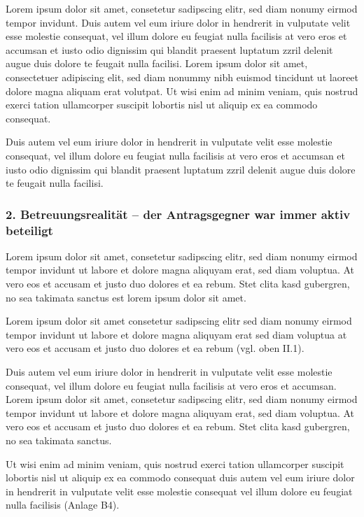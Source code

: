 \documentclass[
  11pt,
  a4paper,
]{article}
\begin{document}
Lorem ipsum dolor sit amet, consetetur sadipscing elitr, sed diam nonumy
eirmod tempor invidunt. Duis autem vel eum iriure dolor in hendrerit in
vulputate velit esse molestie consequat, vel illum dolore eu feugiat
nulla facilisis at vero eros et accumsan et iusto odio dignissim qui
blandit praesent luptatum zzril delenit augue duis dolore te feugait
nulla facilisi. Lorem ipsum dolor sit amet, consectetuer adipiscing
elit, sed diam nonummy nibh euismod tincidunt ut laoreet dolore magna
aliquam erat volutpat. Ut wisi enim ad minim veniam, quis nostrud exerci
tation ullamcorper suscipit lobortis nisl ut aliquip ex ea commodo
consequat.

Duis autem vel eum iriure dolor in hendrerit in vulputate velit esse
molestie consequat, vel illum dolore eu feugiat nulla facilisis at vero
eros et accumsan et iusto odio dignissim qui blandit praesent luptatum
zzril delenit augue duis dolore te feugait nulla facilisi.

\subsubsection{2. Betreuungsrealität -- der Antragsgegner war immer
aktiv
beteiligt}\label{betreuungsrealituxe4t-der-antragsgegner-war-immer-aktiv-beteiligt}

Lorem ipsum dolor sit amet, consetetur sadipscing elitr, sed diam nonumy
eirmod tempor invidunt ut labore et dolore magna aliquyam erat, sed diam
voluptua. At vero eos et accusam et justo duo dolores et ea rebum. Stet
clita kasd gubergren, no sea takimata sanctus est lorem ipsum dolor sit
amet.

Lorem ipsum dolor sit amet consetetur sadipscing elitr sed diam nonumy
eirmod tempor invidunt ut labore et dolore magna aliquyam erat sed diam
voluptua at vero eos et accusam et justo duo dolores et ea rebum (vgl.
oben II.1).

Duis autem vel eum iriure dolor in hendrerit in vulputate velit esse
molestie consequat, vel illum dolore eu feugiat nulla facilisis at vero
eros et accumsan. Lorem ipsum dolor sit amet, consetetur sadipscing
elitr, sed diam nonumy eirmod tempor invidunt ut labore et dolore magna
aliquyam erat, sed diam voluptua. At vero eos et accusam et justo duo
dolores et ea rebum. Stet clita kasd gubergren, no sea takimata sanctus.

Ut wisi enim ad minim veniam, quis nostrud exerci tation ullamcorper
suscipit lobortis nisl ut aliquip ex ea commodo consequat duis autem vel
eum iriure dolor in hendrerit in vulputate velit esse molestie consequat
vel illum dolore eu feugiat nulla facilisis (Anlage B4).
\end{document}

